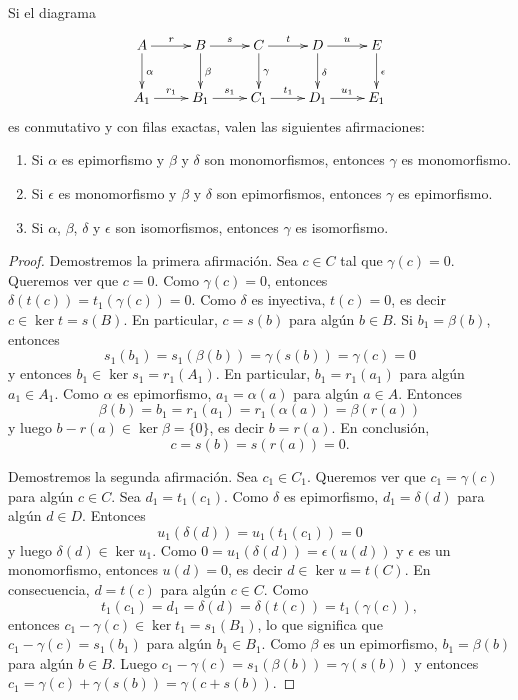 \begin{lemma}
Si el diagrama
	    \begin{equation}
        \xymatrix{
        A\ar[r]^r
        \ar@{->}[d]^{\alpha}
        & B
        \ar@{->}[d]^{\beta}
        \ar[r]^s
        & C
        \ar[r]^t
        \ar[d]^\gamma
        & D\ar[r]^u
        \ar@{->}[d]^\delta 
        & E
		\ar@{->}[d]^\epsilon 
        \\
        A_1\ar[r]^{r_1} 
        & B_1
        \ar[r]^{s_1}
        & C_1
        \ar[r]^{t_1}
        & D_1\ar[r]^{u_1}
        & E_1
        }
        \end{equation} 	
       es conmutativo y con filas exactas, valen las siguientes afirmaciones:
       \begin{enumerate}
       	\item Si $\alpha$ es epimorfismo y $\beta$ y $\delta$ son monomorfismos, entonces $\gamma$ es monomorfismo.
       	\item Si $\epsilon$ es monomorfismo y $\beta$ y $\delta$ son epimorfismos, entonces $\gamma$ es epimorfismo.
       	\item Si $\alpha$, $\beta$, $\delta$ y $\epsilon$ son isomorfismos, entonces $\gamma$ es isomorfismo.
       \end{enumerate}
\end{lemma}

\begin{proof}
	Demostremos la primera afirmación. Sea $c\in C$ tal que $\gamma(c)=0$. Queremos ver que $c=0$. Como $\gamma(c)=0$, 
	entonces $\delta(t(c))=t_1(\gamma(c))=0$. Como $\delta$ es inyectiva, $t(c)=0$, es decir $c\in \ker t=s(B)$. En particular, 
	$c=s(b)$ para algún $b\in B$. Si $b_1=\beta(b)$, entonces
	\[
	s_1(b_1)=s_1(\beta(b))=\gamma(s(b))=\gamma(c)=0
	\]
	y entonces $b_1\in\ker s_1=r_1(A_1)$. En particular, $b_1=r_1(a_1)$ para algún $a_1\in A_1$. Como $\alpha$ es epimorfismo, 
	$a_1=\alpha(a)$ para algún $a\in A$. Entonces
	\[
	\beta(b)=b_1=r_1(a_1)=r_1(\alpha(a))=\beta(r(a))
	\]
	y luego $b-r(a)\in\ker\beta=\{0\}$, es decir $b=r(a)$. En conclusión,  
	\[
	c=s(b)=s(r(a))=0.
	\] 
	
	Demostremos la segunda afirmación. Sea $c_1\in C_1$. Queremos ver que $c_1=\gamma(c)$ para algún $c\in C$. Sea
	$d_1=t_1(c_1)$. Como $\delta$ es epimorfismo, $d_1=\delta(d)$ para algún $d\in D$. Entonces
	\[
	u_1(\delta(d))=u_1(t_1(c_1))=0
	\]
	y luego $\delta(d)\in\ker u_1$. Como $0=u_1(\delta(d))=\epsilon(u(d))$ y $\epsilon$ es un monomorfismo, 
	entonces $u(d)=0$, es decir $d\in\ker u=t(C)$. En consecuencia, $d=t(c)$ para algún $c\in C$. Como
	\[
	t_1(c_1)=d_1=\delta(d)=\delta(t(c))=t_1(\gamma(c)),
	\]
	entonces $c_1-\gamma(c)\in\ker t_1=s_1(B_1)$, lo que significa que $c_1-\gamma(c)=s_1(b_1)$ para algún $b_1\in B_1$. Como
	$\beta$ es un epimorfismo, $b_1=\beta(b)$ para algún $b\in B$. Luego
	$c_1-\gamma(c)=s_1(\beta(b))=\gamma(s(b))$ y entonces
	$c_1=\gamma(c)+\gamma(s(b))=\gamma(c+s(b))$. 
\end{proof}

